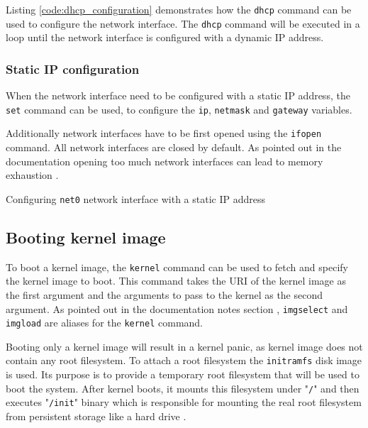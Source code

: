 \documentclass[../main.tex]{subfiles}
\begin{document}
Listing \ref{code:dhcp_configuration} demonstrates how the \texttt{dhcp} command can be used to configure the network interface.
The \texttt{dhcp} command will be executed in a loop until the network interface is configured with a dynamic IP address.

\subsubsection{Static IP configuration}

When the network interface need to be configured with a static IP address, the \texttt{set} command can be used,
to configure the \texttt{ip}, \texttt{netmask} and \texttt{gateway} variables.


Additionally network interfaces have to be first opened using the \texttt{ifopen} command.
All network interfaces are closed by default. As pointed out in the documentation opening too much network interfaces can lead to memory exhaustion \cite{ipxe_opening_interfaces}.

\begin{listing}[H]
  \caption{Configuring \texttt{net0} network interface with a static IP address}
  \label{code:static_ip_configuration}
\end{listing}

\subsection{Booting kernel image}

To boot a kernel image, the \texttt{kernel} command can be used to fetch and specify the kernel image to boot.
This command takes the URI of the kernel image as the first argument and the arguments to pass to the kernel as the second argument.
As pointed out in the documentation notes section \cite{ipxe_kernel_command}, \texttt{imgselect} and \texttt{imgload} are aliases for the \texttt{kernel} command.

Booting only a kernel image will result in a kernel panic, as kernel image does not contain any root filesystem.
To attach a root filesystem the \texttt{initramfs} disk image is used. Its purpose is to provide a temporary root filesystem that will be used to boot the system.
After kernel boots, it mounts this filesystem under  "\texttt{/}" and then executes "\texttt{/init}" binary which is responsible for mounting the real root filesystem from persistent storage like a hard drive \cite{initramfs_purpose}.
\end{document}
